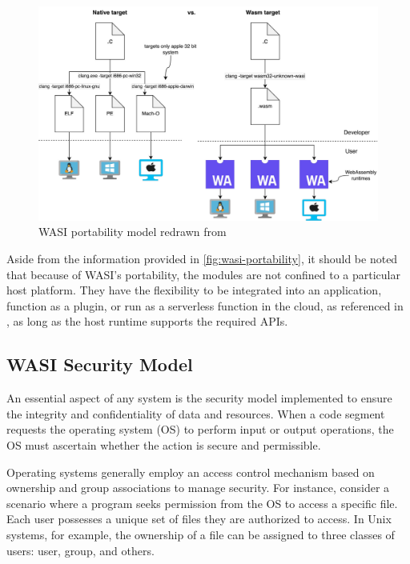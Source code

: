 \begin{figure}[H]
    \centering
        \includegraphics[width=1\linewidth]{images/wasm/WASI_PORTABILITY.pdf}
    \caption{WASI portability model redrawn from \cite{clark_2019_standardising}}
    \label{fig:wasi-portability}
\end{figure}

Aside from the information provided in \autoref{fig:wasi-portability}, it should be noted that because of WASI's portability, the modules are not confined to a particular host platform. They have the flexibility to be integrated into an application, function as a plugin, or run as a serverless function in the cloud, as referenced in \cite{clark_2022_wasmtime}, as long as the host runtime supports the required APIs.

\subsection{WASI Security Model}
\label{subsec:wasi-security-model}

An essential aspect of any system is the security model implemented to ensure the integrity and confidentiality of data and resources. When a code segment requests the operating system (OS) to perform input or output operations, the OS must ascertain whether the action is secure and permissible.

Operating systems generally employ an access control mechanism based on ownership and group associations to manage security. For instance, consider a scenario where a program seeks permission from the OS to access a specific file. Each user possesses a unique set of files they are authorized to access. In Unix systems, for example, the ownership of a file can be assigned to three classes of users: user, group, and others.

